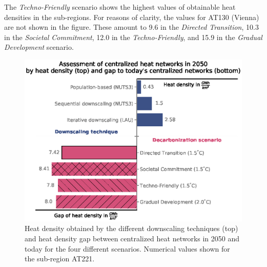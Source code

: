 The \textit{Techno-Friendly} scenario shows the highest values of obtainable heat densities in the sub-regions. For reasons of clarity, the values for AT130 (Vienna) are not shown in the figure. These amount to \SI{9.6}{} in the \textit{Directed Transition}, \SI{10.3}{} in the \textit{Societal Commitment}, \SI{12.0}{} in the \textit{Techno-Friendly}, and \SI{15.9}{} in the \textit{Gradual Development} scenario.

\begin{figure}
	\centering
	\includegraphics[width=1\linewidth]{figures/4_Results/HD.eps}
	\caption{Heat density obtained by the different downscaling techniques (top) and heat density gap between centralized heat networks in 2050 and today for the four different scenarios. Numerical values shown for the sub-region AT221.}
	\label{fig:res4}
\end{figure}